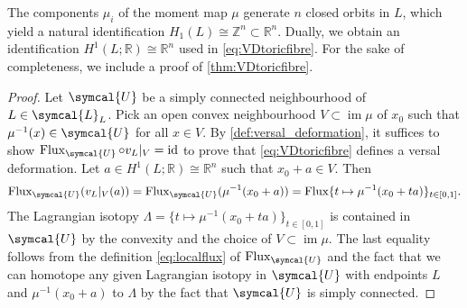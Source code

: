 \documentclass[12pt,a4paper,abstract=true,draft]{scrartcl}
\DeclareMathOperator{\id}{id}
\begin{document}
The components $\mu_i$ of the moment map $\mu$ generate $n$ closed orbits in $L$, which yield a natural identification $H_1(L) \cong \mathbb{Z}^n \subset \mathbb{R}^n$.
Dually, we obtain an identification $H^1(L;\mathbb{R}) \cong \mathbb{R}^n$ used in \eqref{eq:VDtoricfibre}.
For the sake of completeness, we include a proof of \cref{thm:VDtoricfibre}.

\begin{proof}
    Let $\symcal{U}$ be a simply connected neighbourhood of $L \in \symcal{L}_{L}$.
    Pick an open convex neighbourhood $V \subset \operatorname{im} \mu$ of $x_0$ such that $\mu^{-1}(x) \in \symcal{U}$ for all $x \in V$.
    By \cref{def:versal_deformation}, it suffices to show $\operatorname{Flux}_{\symcal{U}} \circ v_L\vert_{V} = \id$ to prove that \eqref{eq:VDtoricfibre} defines a versal deformation.
    Let $a \in H^1(L;\mathbb{R}) \cong \mathbb{R}^n$ such that $x_0 + a \in V$.
Then 
    \begin{equation}
        \operatorname{Flux}_{\symcal{U}} ( v_L\vert_{V} (a))
        = \operatorname{Flux}_{\symcal{U}} (\mu^{-1}(x_0 + a))
        = \operatorname{Flux} \{t \mapsto \mu^{-1}(x_0 + ta) \}_{t \in [0,1]}.
    \end{equation}
    The Lagrangian isotopy $\Lambda = \{t \mapsto \mu^{-1}(x_0 + ta) \}_{t \in [0,1]}$ is contained in $\symcal{U}$ by the convexity and the choice of $V \subset \operatorname{im} \mu$.
    The last equality follows from the definition \eqref{eq:localflux} of $\operatorname{Flux}_{\symcal{U}}$ and the fact that we can homotope any given Lagrangian isotopy in $\symcal{U}$ with endpoints $L$ and $\mu^{-1}(x_0 + a)$ to $\Lambda$ by the fact that $\symcal{U}$ is simply connected. 


\end{proof}
\end{document}
